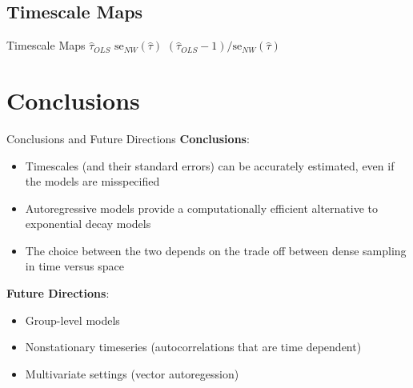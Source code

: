 \documentclass[12pt]{beamer}
\begin{document}
\subsection{Timescale Maps}
\begin{frame}{Timescale Maps}
\scriptsize
$\hat \tau_{OLS}$
$\text{se}_{NW}(\hat \tau)$
$(\hat \tau_{OLS} - 1) / \text{se}_{NW}(\hat \tau)$
\end{frame}

\section{Conclusions}
\begin{frame}{Conclusions and Future Directions}
\textbf{Conclusions}:\\
\begin{itemize}
    \item Timescales (and their standard errors) can be accurately estimated, even if the models are misspecified
    \item Autoregressive models provide a computationally efficient alternative to exponential decay models
    \item The choice between the two depends on the trade off between dense sampling in time versus space
\end{itemize}

\textbf{Future Directions}:\\
\begin{itemize}
    \item Group-level models
    \item Nonstationary timeseries (autocorrelations that are time dependent)
    \item Multivariate settings (vector autoregession)
\end{itemize}
\end{frame}
\end{document}
